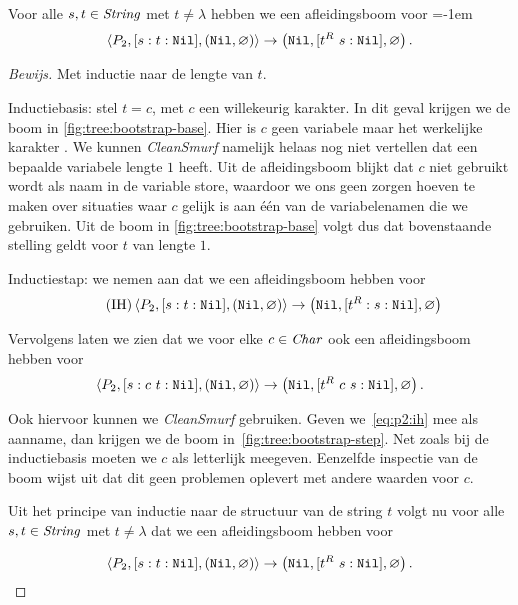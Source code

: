 \begin{thm}
	{
		Voor alle $s,t\in\mathit{String}$ met $t\ne\lambda$ hebben we een afleidingsboom
		voor
		\normalfont
		\belowdisplayskip=-1em
		$$
		\left\langle P_2,[s:t:\texttt{Nil}],(\texttt{Nil},\varnothing)\right\rangle\to\left(\texttt{Nil},[t^R~s:\texttt{Nil}],\varnothing\right).
		$$
	}
	\label{thm:p2}
	\begin{proof}[Bewijs]
		Met inductie naar de lengte van $t$.

		Inductiebasis: stel $t=c$, met $c$ een willekeurig karakter. In dit geval
		krijgen we de boom in \autoref{fig:tree:bootstrap-base}. Hier is $c$ geen
		variabele maar het werkelijke karakter . We kunnen \emph{CleanSmurf}
		namelijk helaas nog niet vertellen dat een bepaalde variabele lengte $1$
		heeft. Uit de afleidingsboom blijkt dat $c$ niet gebruikt wordt als naam in
		de variable store, waardoor we ons geen zorgen hoeven te maken over
		situaties waar $c$ gelijk is aan \'e\'en van de variabelenamen die we
		gebruiken. Uit de boom in \autoref{fig:tree:bootstrap-base} volgt dus dat
		bovenstaande stelling geldt voor $t$ van lengte $1$.

		\medskip
		Inductiestap: we nemen aan dat we een afleidingsboom hebben voor
		\begin{equation}\tag{IH}\label{eq:p2:ih}
			\left\langle P_2,[s:t:\texttt{Nil}],(\texttt{Nil},\varnothing)\right\rangle\to\left(\texttt{Nil},[t^R:s:\texttt{Nil}],\varnothing\right)
		\end{equation}

		Vervolgens laten we zien dat we voor elke $c\in\mathit{Char}$ ook een
		afleidingsboom hebben voor
		$$
		\left\langle P_2,[s:c~t:\texttt{Nil}],(\texttt{Nil},\varnothing)\right\rangle\to\left(\texttt{Nil},[t^R~c~s:\texttt{Nil}],\varnothing\right).
		$$

		Ook hiervoor kunnen we \emph{CleanSmurf} gebruiken. Geven
		we~\eqref{eq:p2:ih} mee als aanname, dan krijgen we de boom
		in~\autoref{fig:tree:bootstrap-step}. Net zoals bij de inductiebasis moeten
		we $c$ als letterlijk  meegeven. Eenzelfde inspectie van de
		boom wijst uit dat dit geen problemen oplevert met andere waarden voor $c$.

		\medskip
		Uit het principe van inductie naar de structuur van de string $t$ volgt nu
		voor alle $s,t\in\mathit{String}$ met $t\ne\lambda$ dat we een afleidingsboom
		hebben voor

		$$
		\left\langle P_2,[s:t:\texttt{Nil}],(\texttt{Nil},\varnothing)\right\rangle\to\left(\texttt{Nil},[t^R~s:\texttt{Nil}],\varnothing\right).
		$$
	\end{proof}
\end{thm}

